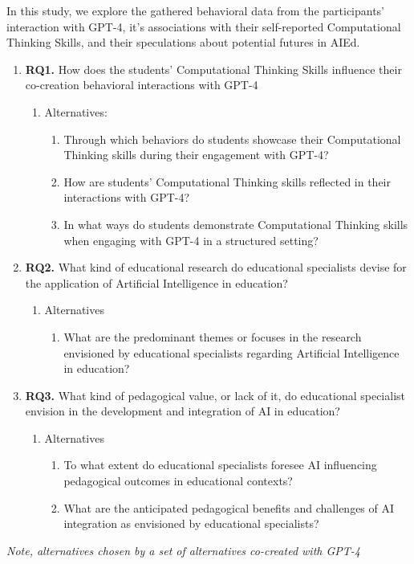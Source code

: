 \documentclass[sn-mathphys, Numbered]{sn-jnl}%
\theoremstyle{thmstyleone}%
\theoremstyle{thmstyletwo}%
\theoremstyle{thmstylethree}%
\begin{document}
In this study, we explore the gathered behavioral data from the participants' interaction with GPT-4, it's associations with their self-reported Computational Thinking Skills, and their speculations about potential futures in AIEd.
\begin{enumerate}
    \item[] \textbf{RQ1.} How does the students' Computational Thinking Skills influence their co-creation behavioral interactions with GPT-4
    \begin{enumerate}
        \item[] Alternatives:
        \begin{enumerate}
            \item  Through which behaviors do students showcase their Computational Thinking skills during their engagement with GPT-4?
            \item How are students' Computational Thinking skills reflected in their interactions with GPT-4? 
            \item In what ways do students demonstrate Computational Thinking skills when engaging with GPT-4 in a structured setting? 
        \end{enumerate}
    \end{enumerate}
    \item[] \textbf{RQ2.} What kind of educational research do educational specialists devise for the application of Artificial Intelligence in education?
    \begin{enumerate}
        \item[] Alternatives
        \begin{enumerate}
            \item What are the predominant themes or focuses in the research envisioned by educational specialists regarding Artificial Intelligence in education? 
        \end{enumerate}
    \end{enumerate}
    \item [] \textbf{RQ3.} What kind of pedagogical value, or lack of it, do educational specialist envision in the development and integration of AI in education?
    \begin{enumerate}
        \item [] Alternatives
        \begin{enumerate}
            \item To what extent do educational specialists foresee AI influencing pedagogical outcomes in educational contexts?
            \item What are the anticipated pedagogical benefits and challenges of AI integration as envisioned by educational specialists? 
        \end{enumerate}
    \end{enumerate}

\end{enumerate}
\textit{Note, alternatives chosen by a set of alternatives co-created with GPT-4 }
\end{document}
